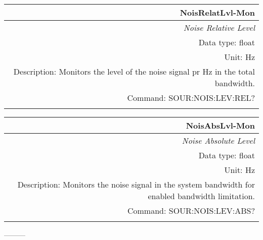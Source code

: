 \documentclass[openany]{article}
\begin{document}
		\begin{tabular}{N}
			\hline
			\bfseries NoisRelatLvl-Mon \\ \hline
			\emph{Noise Relative Level} \\
			Data type: float \\
			Unit: Hz \\
			Description: Monitors the level of the noise signal pr Hz in the total bandwidth. \\
			Command: SOUR:NOIS:LEV:REL? \\
			\\

		\end{tabular}


		\begin{tabular}{N}
			\hline
			\bfseries NoisAbsLvl-Mon \\ \hline
			\emph{Noise Absolute Level} \\
			Data type: float \\
			Unit: Hz \\
			Description: Monitors the noise signal in the system bandwidth for enabled bandwidth limitation. \\
			Command: SOUR:NOIS:LEV:ABS? \\
			\\

		\end{tabular}




---------
\end{document}
